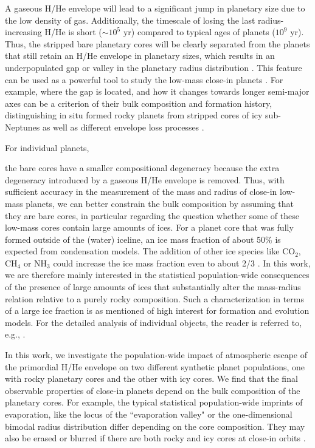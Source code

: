 \documentclass[]{emulateapj}
\begin{document}
{A gaseous H/He envelope will lead to a significant jump in planetary size due to the low density of gas. Additionally, the timescale of losing the last radius-increasing H/He is short  ($\sim10^{5}$ yr) compared to typical  ages of planets ($10^{9}$ yr). Thus, the stripped bare planetary cores will be clearly separated from the planets that still retain an H/He envelope in planetary sizes, which results in an underpopulated gap or valley in the planetary radius distribution \citep{Owen2013,Lopez2013,Jin2014,LopezRice2016,ChenRogers2016}. This feature can be used as a powerful tool to study the low-mass close-in planets {\citep{Lopez2013}}. For example, {where the gap is located}, and how {it} change{s} towards longer semi-major axes can be a criterion of their {bulk composition and} formation history, {distinguishing} in situ formed rocky planets {from} stripped cores of {icy} sub-Neptunes {as well as different envelope loss processes} \citep{Lopez2013, LopezRice2016}.

For individual planets,}  the bare cores have a smaller compositional degeneracy because the extra degeneracy introduced by a gaseous H/He envelope is removed. Thus,  with sufficient accuracy in the measurement of the mass and radius of close-in low-mass planets, we can better constrain the bulk composition by assuming that they are bare cores, in particular regarding the question whether some of these low-mass cores contain  large amounts of ices. For a planet core that was fully formed outside of the (water) iceline, an ice mass fraction of about 50\% is expected from condensation models. The addition of other ice species like CO$_{2}$, CH$_{4}$ or NH$_{3}$ could increase the ice mass fraction even to about 2/3 \citep{Lodders2003,Min2011}. In this work, we are therefore mainly interested in the statistical population-wide consequences of the presence of large amounts of ices that substantially alter the mass-radius relation relative to a purely rocky composition. Such a characterization in terms of a large ice fraction is as mentioned of high interest for formation and evolution models. For the detailed analysis of individual objects, the reader is referred to, e.g., \citet[][]{Dorn2017a,Dorn2017b}.

In this work, we investigate the population-wide impact of atmospheric escape of the primordial H/He envelope on two different synthetic planet populations, one with rocky planetary cores and the other with icy cores. We find that the final observable properties of close-in planets depend on the bulk composition of the planetary cores. For example, the typical statistical population-wide imprints of evaporation, like the locus of the ``evaporation valley" or  the one-dimensional bimodal radius distribution  differ depending on the core composition. They may also be erased or blurred if there are both rocky and icy cores at close-in orbits {\citep{Lopez2013}}. 
\end{document}

